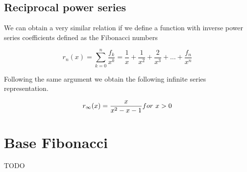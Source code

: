 \documentclass[a4paper]{article}
\begin{document}
\subsection{Reciprocal power series}\label{subsec:reciprocal-power-series}
We can obtain a very similar relation if we define a function with inverse power series coefficients defined as the Fibonacci numbers

\begin{equation}
r_n(x) = \sum_{k=0}^{n} \frac{f_k}{x^k} = \frac{1}{x} + \frac{1}{x^2} + \frac{2}{x^3} + \dots + \frac{f_n}{x^n}
\label{eq:equation21}
\end{equation}

Following the same argument we obtain the following infinite series representation.

\begin{equation}
r_{\infty}(x) = \frac{x}{x^2 - x - 1} for \ x>0 \\
\label{eq:equation22}
\end{equation}


\section{Base Fibonacci}\label{sec:base-fibonacci}
TODO
\end{document}
